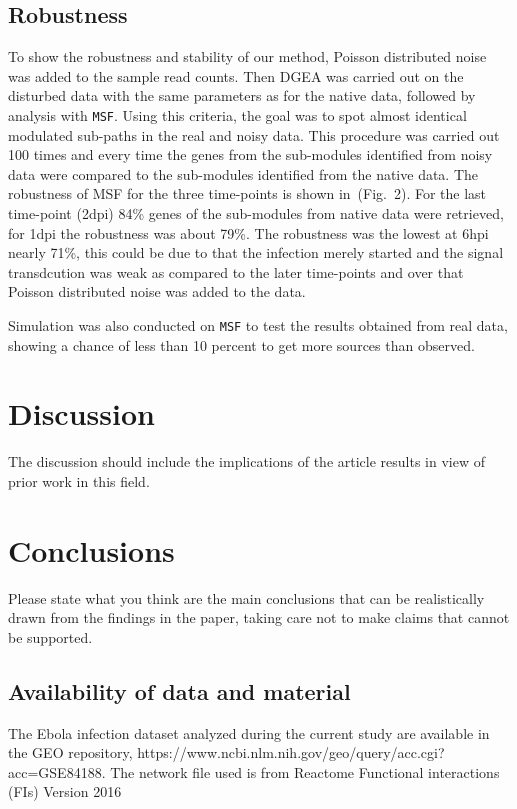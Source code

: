 \documentclass[twocolumn]{article}
\begin{document}
\subsection*{Robustness}

To show the robustness and stability of our method, Poisson
distributed noise was added to the sample read counts. 
Then DGEA was carried out on the disturbed data with the
same parameters as for the native data, followed by analysis with
\texttt{MSF}. Using this criteria, the goal was to spot almost
identical modulated sub-paths in the real and noisy data. This procedure was carried out 100 times and every time the genes from the sub-modules identified from noisy data were compared to the sub-modules identified from the native data. The robustness of MSF for the three time-points is shown in~(Fig.~2). For the last time-point (2dpi) 84\% genes of the sub-modules from native data were retrieved, for 1dpi the robustness was about 79\%. The robustness was the lowest at 6hpi nearly 71\%, this could be due to that the infection merely started and the signal transdcution was weak as compared to the later time-points and over that Poisson distributed noise was added to the data.


Simulation was also conducted on \texttt{MSF} to test the results
obtained from real data, showing a chance of less than 10 percent to
get more sources than observed.



\section*{Discussion}

The discussion should include the implications of the article results
in view of prior work in this field.

\section*{Conclusions}

Please state what you think are the main conclusions that can be
realistically drawn from the findings in the paper, taking care not to
make claims that cannot be supported.

\subsection*{Availability of data and material}

The Ebola infection dataset analyzed during the current study are
available in the GEO repository, {\scriptsize
  https://www.ncbi.nlm.nih.gov/geo/query/acc.cgi?acc=GSE84188.}  The
network file used is from Reactome Functional interactions (FIs)
Version 2016
\end{document}
